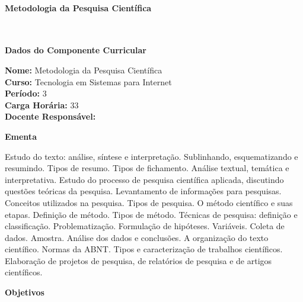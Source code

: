\paragraph{Metodologia da Pesquisa Cient\'ifica} \


\begin{snugshade}\begin{center}\textbf{
    Dados do Componente Curricular
}\end{center}\end{snugshade}

\noindent \textbf{Nome:}                Metodologia da Pesquisa Cient\'ifica
\\        \textbf{Curso:}               Tecnologia em Sistemas para Internet
\\        \textbf{Período:}             \unit{3}{\degree}
\\        \textbf{Carga Horária:}       \unit{33}{\hour}
\\        \textbf{Docente Responsável:} 


\begin{snugshade}\begin{center}\textbf{
    Ementa
\vphantom{q}}\end{center}\end{snugshade}

\noindent
Estudo do texto: análise, síntese e interpretação. Sublinhando, esquematizando e resumindo. Tipos de resumo. Tipos de fichamento. Análise textual, temática e interpretativa. Estudo do processo de pesquisa científica aplicada, discutindo questões teóricas da pesquisa. Levantamento de informações para pesquisas. Conceitos utilizados na pesquisa. Tipos de pesquisa. O método científico e suas etapas. Definição de método. Tipos de método. Técnicas de pesquisa: definição e classificação. Problematização. Formulação de hipóteses. Variáveis. Coleta de dados. Amostra. Análise dos dados e conclusões. A organização do texto científico. Normas da ABNT. Tipos e caracterização de trabalhos científicos. Elaboração de projetos de pesquisa, de relatórios de pesquisa e de artigos científicos.


\begin{snugshade}\begin{center}\textbf{
    Objetivos
}\end{center}\end{snugshade}

